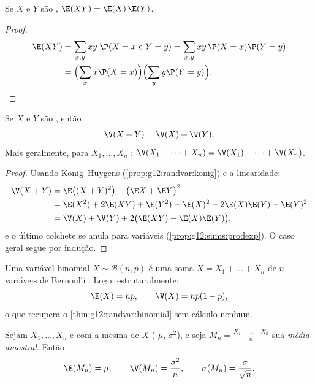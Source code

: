 \begin{proposition}\label{prop:g12:sums:prodexp}
Se $X$ e $Y$ são , $\E(XY) = \E(X)\,\E(Y)$.
\end{proposition}

\begin{proof}
\[
\begin{aligned}
\E(XY) &= \sum_{x, y} xy\;\P(X = x \text{ e } Y = y)
= \sum_{x, y} xy\,\P(X=x)\P(Y=y) \\
&= \Bigl(\sum_x x\P(X=x)\Bigr)\Bigl(\sum_y y\P(Y=y)\Bigr). \qedhere
\end{aligned}
\]
\end{proof}

\begin{theorem}\label{thm:g12:sums:variance}
Se $X$ e $Y$ são \emph{}, então
\[
\V(X + Y) = \V(X) + \V(Y).
\]
Mais geralmente, para $X_1, \dots, X_n$ :
$\V(X_1 + \dots + X_n) = \V(X_1) + \dots + \V(X_n)$.
\end{theorem}

\begin{proof}
Usando König--Huygens (\cref{prop:g12:randvar:konig}) e a linearidade:
\begin{align*}
\V(X + Y) &= \E\bigl((X+Y)^2\bigr) - \bigl(\E X + \E Y\bigr)^2\\
&= \E(X^2) + 2\E(XY) + \E(Y^2)
- \E(X)^2 - 2\E(X)\E(Y) - \E(Y)^2\\
&= \V(X) + \V(Y) + 2\bigl(\E(XY) - \E(X)\E(Y)\bigr),
\end{align*}
e o último colchete se anula para variáveis 
(\cref{prop:g12:sums:prodexp}). O caso geral segue por indução.
\end{proof}

\begin{example}\label{ex:g12:sums:binomial}
Uma variável binomial $X \sim \mathcal B(n, p)$ é uma soma
$X = X_1 + \dots + X_n$ de $n$ variáveis de Bernoulli . Logo,
estruturalmente:
\[
\E(X) = np, \qquad \V(X) = np(1-p),
\]
o que recupera o \cref{thm:g12:randvar:binomial} sem cálculo nenhum.
\end{example}

\begin{proposition}\label{prop:g12:sums:mean}
Sejam $X_1, \dots, X_n$  e com a mesma  de $X$
( $\mu$,  $\sigma^2$), e seja
$M_n = \frac{X_1 + \dots + X_n}{n}$ sua \emph{média amostral}. Então
\[
\E(M_n) = \mu, \qquad \V(M_n) = \frac{\sigma^2}{n}, \qquad
\sigma(M_n) = \frac{\sigma}{\sqrt n}.
\]
\end{proposition}

